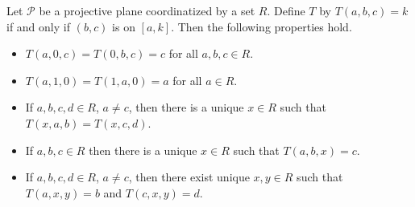 Let $\mathcal{P}$ be a projective plane coordinatized by a set $R$. Define $T$ by $T(a, b, c) = k$ if and only if $(b, c)$ is on $[a, k]$. Then the following properties hold.

\begin{itemize}
  \item[(A)] $T(a, 0, c) = T(0, b, c) = c$ for all $a, b, c \in R$.
  \item[(B)] $T(a, 1, 0) = T(1, a, 0) = a$ for all $a \in R$.
  \item[(C)] If $a, b, c, d \in R$, $a \neq c$, then there is a unique $x \in R$ such that $T(x, a, b) = T(x, c, d)$.
  \item[(D)] If $a, b, c \in R$ then there is a unique $x \in R$ such that $T(a, b, x) = c$.
  \item[(E)] If $a, b, c, d \in R$, $a \neq c$, then there exist unique $x, y \in R$ such that $T(a, x, y) = b$ and $T(c, x, y) = d$.
\end{itemize}
